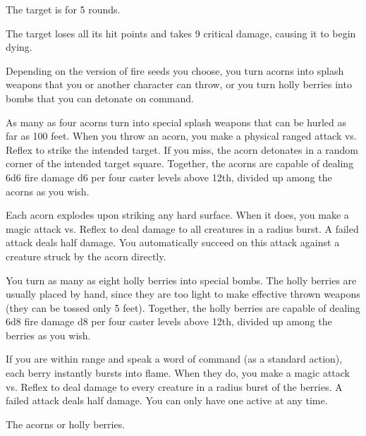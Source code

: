 \begin{spellhealthy}
    The target is \staggered for 5 rounds.
\end{spellhealthy}
\begin{spellblood}
    The target loses all its hit points and takes 9 critical damage, causing it to begin dying.
\end{spellblood}

\spelleffect Depending on the version of fire seeds you choose, you turn acorns into splash weapons that you or another character can throw, or you turn holly berries into bombs that you can detonate on command.
\par {} As many as four acorns turn into special splash weapons that can be hurled as far as 100 feet. When you throw an acorn, you make a physical ranged attack vs. Reflex to strike the intended target. If you miss, the acorn detonates in a random corner of the intended target square. Together, the acorns are capable of dealing 6d6 fire damage \add d6 per four caster levels above 12th, divided up among the acorns as you wish.
\par Each acorn explodes upon striking any hard surface. When it does, you make a magic attack vs. Reflex to deal damage to all creatures in a \areasmall radius burst. A failed attack deals half damage. You automatically succeed on this attack against a creature struck by the acorn directly.
\par {} You turn as many as eight holly berries into special bombs. The holly berries are usually placed by hand, since they are too light to make effective thrown weapons (they can be tossed only 5 feet). Together, the holly berries are capable of dealing 6d8 fire damage \add d8 per four caster levels above 12th, divided up among the berries as you wish.
\par If you are within \rngmed range and speak a word of command (as a standard action), each berry instantly bursts into flame. When they do, you make a magic attack vs. Reflex to deal damage to every creature in a \areamed radius burst of the berries. A failed attack deals half damage.
\spellnotes You can only have one  active at any time.
\par {} The acorns or holly berries.

